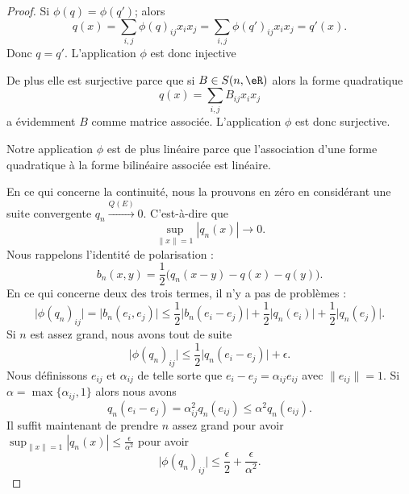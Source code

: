 \begin{proof}
	Si \( \phi(q)=\phi(q')\); alors
	\begin{equation}
		q(x)=\sum_{i,j}\phi(q)_{ij}x_ix_j=\sum_{i,j}\phi(q')_{ij}x_ix_j=q'(x).
	\end{equation}
	Donc \( q=q'\). L'application \( \phi\) est donc injective

	De plus elle est surjective parce que si \( B\in S(n,\eR)\) alors la forme quadratique
	\begin{equation}
		q(x)=\sum_{i,j}B_{ij}x_ix_j
	\end{equation}
	a évidemment \( B\) comme matrice associée. L'application \( \phi\) est donc surjective.

	Notre application \( \phi\) est de plus linéaire parce que l'association d'une forme quadratique à la forme bilinéaire associée est linéaire.

	En ce qui concerne la continuité, nous la prouvons en zéro en considérant une suite convergente \( q_n\stackrel{Q(E)}{\longrightarrow}0\). C'est-à-dire que
	\begin{equation}
		\sup_{\| x \|=1}| q_n(x) |\to 0.
	\end{equation}
	Nous rappelons l'identité de polarisation :
	\begin{equation}
		b_n(x,y)=\frac{ 1 }{2}\big( q_n(x-y)-q(x)-q(y) \big).
	\end{equation}
	En ce qui concerne deux des trois termes, il n'y a pas de problèmes :
	\begin{equation}
		\big| \phi(q_n)_{ij} \big|=\big| b_n(e_i,e_j) \big|\leq\frac{ 1 }{2}\big| b_n(e_i-e_j) \big|+\frac{ 1 }{2}\big| q_n(e_i) \big|+\frac{ 1 }{2}\big| q_n(e_j) \big|.
	\end{equation}
	Si \( n\) est assez grand, nous avons tout de suite
	\begin{equation}
		\big| \phi(q_n)_{ij} \big|\leq \frac{ 1 }{2}\big| q_n(e_i-e_j) \big|+\epsilon.
	\end{equation}
	Nous définissons \( e_{ij}\) et \( \alpha_{ij}\) de telle sorte que \( e_i-e_j=\alpha_{ij}e_{ij}\) avec \( \| e_{ij} \|=1\). Si \( \alpha=\max\{ \alpha_{ij},1 \}\) alors nous avons
	\begin{equation}
		q_n(e_i-e_j)=\alpha_{ij}^2q_n(e_{ij})\leq \alpha^2q_n(e_{ij}).
	\end{equation}
	Il suffit maintenant de prendre \( n\) assez grand pour avoir \( \sup_{\| x \|=1}| q_n(x) |\leq \frac{ \epsilon }{ \alpha^2 }\) pour avoir
	\begin{equation}
		\big| \phi(q_n)_{ij} \big|\leq \frac{ \epsilon }{2}+\frac{ \epsilon }{ \alpha^2 }.
	\end{equation}
\end{proof}


